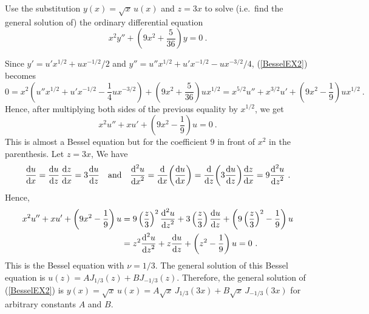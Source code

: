 \begin{egg}
Use the substitution $y(x)=\sqrt{x}\, u(x)$ and $z=3x$ to solve
(i.e.\ find the general solution of) the ordinary differential equation
\begin{equation}\label{BesselEX2}
x^2 y''+ \left( 9x^2 + \frac{5}{36}\right) y = 0 \ .
\end{equation}

Since
$\displaystyle y'= u' x^{1/2}+ u  x^{-1/2}/2$ and
$\displaystyle y''= u'' x^{1/2}+ u' x^{-1/2} - u x^{-3/2}/4$,
(\ref{BesselEX2}) becomes
\[
0 =x^2 \left(u'' x^{1/2}+ u' x^{-1/2} - \frac{1}{4} u x^{-3/2}\right)
+\left(9x^2 + \frac{5}{36}\right) u x^{1/2}
= x^{5/2} u'' + x^{3/2} u' + \left( 9  x^2 - \frac{1}{9}\right) u x^{1/2} \ .
\]
Hence, after multiplying both sides of the previous equality by
$\displaystyle x^{1/2}$, we get
\[
x^2 u'' + x u' + \left( 9  x^2 - \frac{1}{9}\right) u =0 \ .
\]
This is almost a Bessel equation but for the coefficient $9$ in front
of $\displaystyle x^2$ in the parenthesis.  Let $z=3x$,  We have
\[
\dydx{u}{x} = \dydx{u}{z}\,\dydx{z}{x} = 3 \dydx{u}{z}
\quad \text{and} \quad
\dydxn{u}{x}{2} = \dfdx{\left( \dydx{u}{x} \right)}{x}
= \dfdx{\left( 3 \dydx{u}{z} \right)}{z} \dydx{z}{x} = 9 \dydxn{u}{z}{2} \ .
\]
Hence,
\begin{align*}
x^2 u'' + x u' + \left( 9 x^2 - \frac{1}{9}\right) u
&= 9 \left(\frac{z}{3}\right)^2\dydxn{u}{z}{2}
+ 3\left( \frac{z}{3}\right) \dydx{u}{z}
+ \left( 9 \left( \frac{z}{3}\right)^2 - \frac{1}{9}\right) u \\
&= z^2  \dydxn{u}{z}{2}
+ z \dydx{u}{z} + \left(z^2 - \frac{1}{9}\right) u =0 \ .
\end{align*}
This is the Bessel equation with $\nu = 1/3$.
The general solution of this Bessel equation is
$\displaystyle u(z) = A J_{1/3}(z) + B J_{-1/3}(z)$.  Therefore, the
general solution of (\ref{BesselEX2}) is
$\displaystyle y(x) = \sqrt{x} \, u(x) =
A \sqrt{x}\, J_{1/3}(3x)+ B \sqrt{x}\, J_{-1/3}(3x)$
for arbitrary constants $A$ and $B$.
\end{egg}

